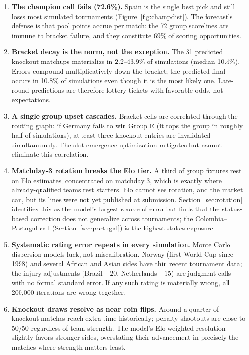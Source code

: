 \documentclass[11pt,letterpaper]{article}
\begin{document}
\begin{enumerate}
\item \textbf{The champion call fails (72.6\%).} Spain is the single best pick and still loses most simulated tournaments (Figure~\ref{fig:champdist}). The forecast's defense is that pool points accrue per match: the 72 group scorelines are immune to bracket failure, and they constitute 69\% of scoring opportunities.
\item \textbf{Bracket decay is the norm, not the exception.} The 31 predicted knockout matchups materialize in 2.2--43.9\% of simulations (median 10.4\%). Errors compound multiplicatively down the bracket; the predicted final occurs in 10.8\% of simulations even though it is the most likely one. Late-round predictions are therefore lottery tickets with favorable odds, not expectations.
\item \textbf{A single group upset cascades.} Bracket cells are correlated through the routing graph: if Germany fails to win Group E (it tops the group in roughly half of simulations), at least three knockout entries are invalidated simultaneously. The slot-emergence optimization mitigates but cannot eliminate this correlation.
\item \textbf{Matchday-3 rotation breaks the Elo tier.} A third of group fixtures rest on Elo estimates, concentrated on matchday 3, which is exactly where already-qualified teams rest starters. Elo cannot see rotation, and the market can, but its lines were not yet published at submission. Section~\ref{sec:rotation} identifies this as the model's largest source of error but finds that the status-based correction does not generalize across tournaments; the Colombia--Portugal call (Section~\ref{sec:portugal}) is the highest-stakes exposure.
\item \textbf{Systematic rating error repeats in every simulation.} Monte Carlo dispersion models luck, not miscalibration. Norway (first World Cup since 1998) and several African and Asian sides have thin recent tournament data; the injury adjustments (Brazil $-20$, Netherlands $-15$) are judgment calls with no formal standard error. If any such rating is materially wrong, all 200{,}000 iterations are wrong together.
\item \textbf{Knockout draws resolve as near coin flips.} Around a quarter of knockout matches reach extra time historically; penalty shootouts are close to 50/50 regardless of team strength. The model's Elo-weighted resolution slightly favors stronger sides, overstating their advancement in precisely the matches where strength matters least.
\end{enumerate}
\end{document}
